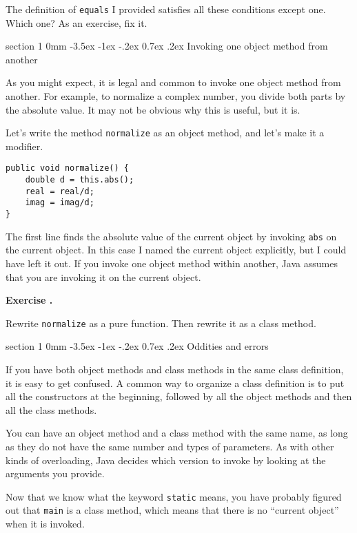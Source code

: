 \documentclass{book}
\makeatletter
\newcounter{exercisenum}
\renewcommand{\theexercisenum}{{\thechapter}.\arabic{exercisenum}}
\newenvironment{exercisesize}{\begin{small}}{\end{small}}
\newcommand{\exerciseheader}[2]{                                          
     
  \begin{exercisesize}                                                    
     
     
  \def\theenumi{\alph{enumi}}                                             
  \def\labelenumi{\theenumi.}                                             
  \def\theenumii{\roman{enumii}}                                          
  \def\labelenumii{\theenumii.}                                           
  {\bf Exercise {#1}{#2}}\hspace{0.1in}                 
}
\newcommand{\startexercise}[1]{%
  \refstepcounter{exercisenum}                                            
  \exerciseheader{\theexercisenum}{#1}                                    
}
\newcommand{\stopexercise}{%
  {\hfill}                                                               
  \end{exercisesize}      
}
\newcommand{\normaldif}{}
\newenvironment{exercise}{\startexercise{\normaldif{}}}{\stopexercise}
\renewcommand{\section}{\@startsection 
    {section} {1} {0mm}%
    {-3.5ex \@plus -1ex \@minus -.2ex}%
    {0.7ex \@plus.2ex}%
    {\normalfont\Large\bfseries}}
\makeatother
\begin{document}
The definition of {\tt equals} I provided satisfies all these
conditions except one.  Which one?  As an exercise, fix it.


\section{Invoking one object method from another}

As you might expect, it is legal and common to invoke
one object method from another.  For example, to normalize a
complex number, you divide both parts by the absolute
value.  It may not be obvious why this is useful, but it is.

Let's write the method {\tt normalize} as an object method, and
let's make it a modifier.

\begin{verbatim}
public void normalize() {
    double d = this.abs();
    real = real/d;
    imag = imag/d;
}
\end{verbatim}
%
The first line finds the absolute value of the current object
by invoking {\tt abs} on the current object.  In this case
I named the current object explicitly, but I could have left
it out.  If you invoke one object method within another, Java
assumes that you are invoking it on the current object.

\begin{exercise}
Rewrite {\tt normalize} as a pure function. 
Then rewrite it as a class method.
\end{exercise}


\section{Oddities and errors}

If you have both object methods and class methods in the same class
definition, it is easy to get confused.  A common way to organize a
class definition is to put all the constructors at the beginning,
followed by all the object methods and then all the class methods.

You can have an object method and a class method with the same
name, as long as they do not have the same number and types of
parameters.  As with other kinds of overloading, Java decides
which version to invoke by looking at the arguments you provide.


Now that we know what the keyword {\tt static} means, you
have probably figured out that {\tt main} is a class method,
which means that there is no ``current object'' when it is invoked.
\end{document}
